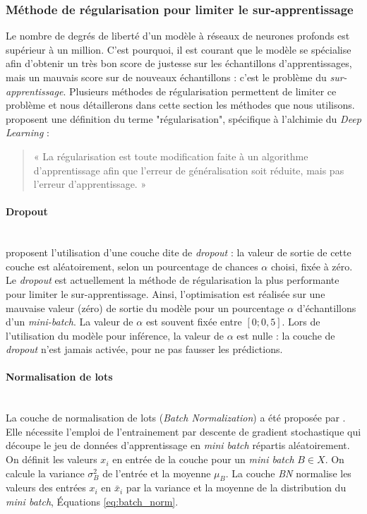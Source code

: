 \subsubsection{Méthode de régularisation pour limiter le sur-apprentissage}
Le nombre de degrés de liberté d'un modèle à réseaux de neurones profonds est supérieur à un million.
C'est pourquoi, il est courant que le modèle se spécialise afin d'obtenir un très bon score de justesse sur les échantillons d'apprentissages, mais un mauvais score sur de nouveaux échantillons : c'est le problème du \emph{sur-apprentissage}.
Plusieurs méthodes de régularisation permettent de limiter ce problème et nous détaillerons dans cette section les méthodes que nous utilisons.
\citeauthor{goodfellow_deep_2016} proposent une définition du terme "régularisation", spécifique à l'alchimie du \textit{Deep Learning} \cite{goodfellow_deep_2016} :
\begin{quote}
    « La régularisation est toute modification faite à un algorithme d'apprentissage afin que l'erreur de généralisation soit réduite, mais pas l'erreur d'apprentissage. »
\end{quote}

\paragraph{Dropout}\mbox{} \label{parag:dropout} \\
\citeauthor{srivastava_dropout_2014} \cite{srivastava_dropout_2014} proposent l'utilisation d'une couche dite de \textit{dropout} : la valeur de sortie de cette couche est aléatoirement, selon un pourcentage de chances $\alpha$ choisi, fixée à zéro. Le \textit{dropout} est actuellement la méthode de régularisation la plus performante pour limiter le sur-apprentissage.
Ainsi, l'optimisation est réalisée sur une mauvaise valeur (zéro) de sortie du modèle pour un pourcentage $\alpha$ d'échantillons d'un \textit{mini-batch}.
La valeur de $\alpha$ est souvent fixée entre $[0 ; 0,5]$.
Lors de l'utilisation du modèle pour inférence, la valeur de $\alpha$ est nulle : la couche de \textit{dropout} n'est jamais activée, pour ne pas fausser les prédictions.

\paragraph{Normalisation de lots}\mbox{} \label{parag:batchnorm} \\
La couche de normalisation de lots (\textit{Batch Normalization}) a été proposée par \citeauthor{ioffe_batch_2015} \cite{ioffe_batch_2015}.
Elle nécessite l'emploi de l'entrainement par descente de gradient stochastique qui découpe le jeu de données d'apprentissage en \textit{mini batch} répartis aléatoirement.
On définit les valeurs $x_i$ en entrée de la couche pour un \textit{mini batch} $B \in X$.
On calcule la variance $\sigma_B^2$ de l'entrée et la moyenne $\mu_B$.
La couche \textit{BN} normalise les valeurs des entrées $x_i$ en $\bar{x}_{i}$ par la variance et la moyenne de la distribution du \textit{mini batch}, Équations \ref{eq:batch_norm}.

